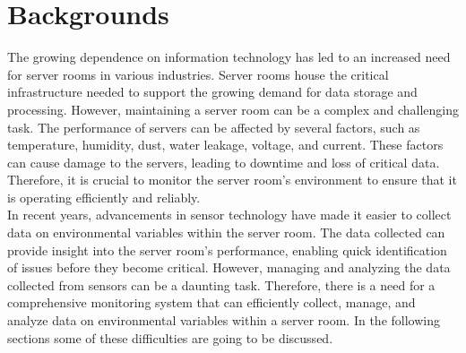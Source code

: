 \section{Backgrounds}
The growing dependence on information technology has led to an increased need for server rooms in various industries. Server rooms house the critical infrastructure needed to support the growing demand for data storage and processing. However, maintaining a server room can be a complex and challenging task. The performance of servers can be affected by several factors, such as temperature, humidity, dust, water leakage, voltage, and current. These factors can cause damage to the servers, leading to downtime and loss of critical data. Therefore, it is crucial to monitor the server room's environment to ensure that it is operating efficiently and reliably.\\

In recent years, advancements in sensor technology have made it easier to collect data on environmental variables within the server room. The data collected can provide insight into the server room's performance, enabling quick identification of issues before they become critical. However, managing and analyzing the data collected from sensors can be a daunting task. Therefore, there is a need for a comprehensive monitoring system that can efficiently collect, manage, and analyze data on environmental variables within a server room. In the following sections some of these difficulties are going to be discussed.

